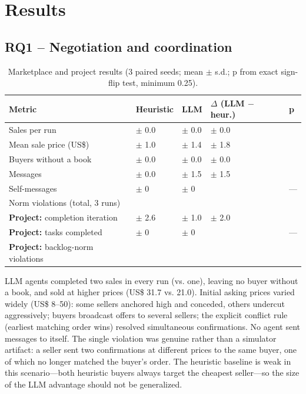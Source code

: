 \documentclass{ieeeaccess}
\begin{document}
\section{Results}\label{sec:4}
\subsection{RQ1 – Negotiation and coordination}\label{sec:4.1}
\begin{table}[!t]
\centering
\caption{Marketplace and project results (3 paired seeds; mean $\pm$ s.d.; p from exact sign-flip test, minimum 0.25).}
\label{tab:5}
\footnotesize
\setlength{\tabcolsep}{0.06cm}
\renewcommand{\arraystretch}{1.15}
\begin{tabular}{@{}>{\raggedright\arraybackslash}p{}>{\raggedright\arraybackslash}p{}>{\raggedright\arraybackslash}p{}>{\raggedright\arraybackslash}p{}>{\raggedright\arraybackslash}p{}@{}}
\hline
\textbf{Metric} & \textbf{Heuristic} & \textbf{LLM} & \textbf{$\Delta$ (LLM $-$ heur.)} & \textbf{p} \\ \hline
Sales per run & 1.0 $\pm$ 0.0 & 2.0 $\pm$ 0.0 & 1.0 $\pm$ 0.0 & 0.25 \\
Mean sale price (US\$) & 21.0 $\pm$ 1.0 & 31.7 $\pm$ 1.4 & 10.7 $\pm$ 1.8 & 0.25 \\
Buyers without a book & 1.0 $\pm$ 0.0 & 0.0 $\pm$ 0.0 & -1.0 $\pm$ 0.0 & 0.25 \\
Messages & 27.0 $\pm$ 0.0 & 37.7 $\pm$ 1.5 & 10.7 $\pm$ 1.5 & 0.25 \\
Self-messages & 0 $\pm$ 0 & 0 $\pm$ 0 & 0 & — \\
Norm violations (total, 3 runs) & 0 & 1 &  &  \\
\textbf{Project:} completion iteration & 33.0 $\pm$ 2.6 & 35.0 $\pm$ 1.0 & 2.0 $\pm$ 2.0 & 0.50 \\
\textbf{Project:} tasks completed & 25 $\pm$ 0 & 25 $\pm$ 0 & 0 & — \\
\textbf{Project:} backlog-norm violations & 0 & 0 &  &  \\ \hline
\end{tabular}
\end{table}

LLM agents completed two sales in every run (vs. one), leaving no buyer without a book, and sold at higher prices (US\$ 31.7 vs. 21.0). Initial asking prices varied widely (US\$ 8–50): some sellers anchored high and conceded, others undercut aggressively; buyers broadcast offers to several sellers; the explicit conflict rule (earliest matching order wins) resolved simultaneous confirmations. No agent sent messages to itself. The single violation was genuine rather than a simulator artifact: a seller sent two confirmations at different prices to the same buyer, one of which no longer matched the buyer's order. The heuristic baseline is weak in this scenario—both heuristic buyers always target the cheapest seller—so the size of the LLM advantage should not be generalized.
\end{document}

